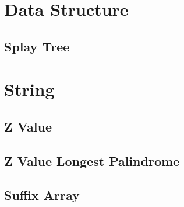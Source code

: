 \documentclass[10pt,twocolumn,oneside]{article}
\begin{document}
    \section{Data Structure}
    \subsection{Splay Tree}
    
    \newpage

    \section{String}
    \subsection{Z Value}
    
    \subsection{Z Value Longest Palindrome}
    
    \subsection{Suffix Array}
    
    \newpage

    
\end{document}
